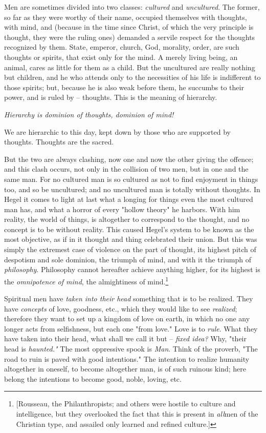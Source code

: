 \documentclass[a4paper]{book}
\begin{document}
Men are sometimes divided into two classes: \textit{cultured} and 
\textit{uncultured}. The former, so far as they were worthy of their name, 
occupied themselves with thoughts, with mind, and (because in the time since 
Christ, of which the very principle is thought, they were the ruling ones) 
demanded a servile respect for the thoughts recognized by them. State, 
emperor, church, God, morality, order, are such thoughts or spirits, that 
exist only for the mind. A merely living being, an animal, cares as little for 
them as a child. But the uncultured are really nothing but children, and he 
who attends only to the necessities of his life is indifferent to those 
spirits; but, because he is also weak before them, he succumbs to their power, 
and is ruled by -- thoughts. This is the meaning of hierarchy.

\textit{Hierarchy is dominion of thoughts, dominion of mind!}

We are hierarchic to this day, kept down by those who are supported by 
thoughts. Thoughts are the sacred.

But the two are always clashing, now one and now the other giving the offence; 
and this clash occurs, not only in the collision of two men, but in one and 
the same man. For no cultured man is so cultured as not to find enjoyment in 
things too, and so be uncultured; and no uncultured man is totally without 
thoughts. In Hegel it comes to light at last what a longing for things even 
the most cultured man has, and what a horror of every "{}hollow theory"{} he 
harbors. With him reality, the world of things, is altogether to correspond to 
the thought, and no concept is to be without reality. This caused Hegel's 
system to be known as the most objective, as if in it thought and thing 
celebrated their union. But this was simply the extremest case of violence on 
the part of thought, its highest pitch of despotism and sole dominion, the 
triumph of mind, and with it the triumph of \textit{philosophy}. Philosophy 
cannot hereafter achieve anything higher, for its highest is the 
\textit{omnipotence of mind}, the almightiness of mind.\footnote{[Rousseau, 
the Philanthropists; and others were hostile to culture and intelligence, but 
they overlooked the fact that this is present in \textit{all}men of the 
Christian type, and assailed only learned and refined culture.]}

Spiritual men have \textit{taken into their head} something that is to be 
realized. They have \textit{concepts} of love, goodness, etc., which they 
would like to see \textit{realized}; therefore they want to set up a kingdom 
of love on earth, in which no one any longer acts from selfishness, but each 
one "{}from love."{} Love is to \textit{rule}. What they have taken into their 
head, what shall we call it but -- \textit{fixed idea?} Why, "{}their head is 
\textit{haunted."{}} The most oppressive spook is \textit{Man}. Think of the 
proverb, "{}The road to ruin is paved with good intentions."{} The intention 
to realize humanity altogether in oneself, to become altogether man, is of 
such ruinous kind; here belong the intentions to become good, noble, loving, 
etc.
\end{document}
